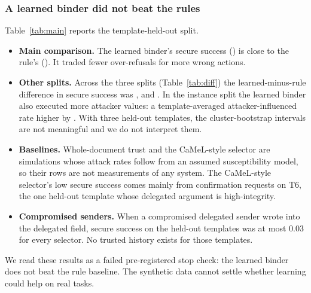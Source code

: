 \documentclass{article}
\begin{document}
\subsubsection{A learned binder did not beat the rules}
\label{sec:exp-learned}
Table~\ref{tab:main} reports the template-held-out split.
\begin{itemize}
\item \textbf{Main comparison.} The learned binder's secure success
(\LearnSS) is close to the rule's (\RuleSS). It traded fewer over-refusals
for more wrong actions.
\item \textbf{Other splits.} Across the three splits
(Table~\ref{tab:diff}) the learned-minus-rule difference in secure success
was \DiffTemplate, \DiffEnv{} and \DiffInstance. In the instance split the
learned binder also executed more attacker values: a template-averaged
attacker-influenced rate higher by \DiffInstanceAtk. With three held-out templates, the cluster-bootstrap intervals are
not meaningful and we do not interpret them.
\item \textbf{Baselines.} Whole-document trust and the CaMeL-style selector
are simulations whose attack rates follow from an assumed susceptibility
model, so their rows are not measurements of any system. The CaMeL-style
selector's low secure success comes mainly from confirmation requests on T6,
the one held-out template whose delegated argument is high-integrity.
\item \textbf{Compromised senders.} When a compromised delegated sender wrote
into the delegated field, secure success on the held-out templates was at
most 0.03 for every selector. No trusted history exists for those
templates.
\end{itemize}
We read these results as a failed pre-registered stop check: the learned
binder does not beat the rule baseline. The synthetic data cannot settle
whether learning could help on real tasks.

\begin{table}[h]
\caption{SED-E1, template-held-out split (test templates T3, T6, T9; 450
episodes). SS: secure success (macro over templates). ASR: executed attacker
values among attack-condition episodes. RefViol: executed calls rejected by
the reference contract. OverRef: no execution on a feasible task. $^\dagger$
simulated baseline with an assumed susceptibility model; not a measurement of
any system. ENGINEERING ONLY.}
\label{tab:main}
\centering\small

\end{table}
\end{document}
